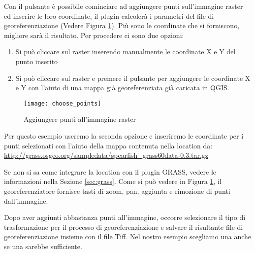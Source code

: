Con il pulsante  è possibile cominciare ad aggiungere punti sull'immagine raster ed inserire le loro coordinate, il plugin calcolerà i parametri del file di georeferenziazione (Vedere Figura \ref{fig:choose_points}).
Più sono le coordinate che si forniscono, migliore sarà il risultato. Per procedere ci sono due opzioni:

\begin{enumerate}
\item Si può cliccare sul raster inserendo manualmente le coordinate X e Y del punto inserito
\item Si può cliccare sul raster e premere il pulsante  per aggiungere le coordinate X e Y con l'aiuto di una mappa già georeferenziata già caricata in QGIS.
\end{enumerate}

\begin{figure}[ht]
\begin{center}
  \caption{Aggiungere punti all'immagine raster \nixcaption}\label{fig:choose_points}\smallskip
  \texttt{[image: choose\_points]}
\end{center}
\end{figure}

Per questo esempio useremo la seconda opzione e inseriremo le coordinate per i punti selezionati con l'aiuto della mappa  contenuta nella location  da: \url{http://grass.osgeo.org/sampledata/spearfish\_grass60data-0.3.tar.gz}

Se non si sa come integrare la location  con il plugin GRASS, vedere le informazioni nella Sezione \ref{sec:grass}. Come si può vedere in Figura \ref{fig:choose_points}, il georeferenziatore fornisce tasti di zoom, pan, aggiunta e rimozione di punti dall'immagine.

Dopo aver aggiunti abbastanza punti all'immagine, occorre selezionare il tipo di trasformazione per il processo di georeferenziazione e salvare il risultante file di georeferenziazione insieme con il file Tiff.
Nel nostro esempio scegliamo una
anche se una
sarebbe sufficiente.


\begin{Tip}\caption{\textsc{Scegliere il tipo di trasformazione}}
\end{Tip} 

